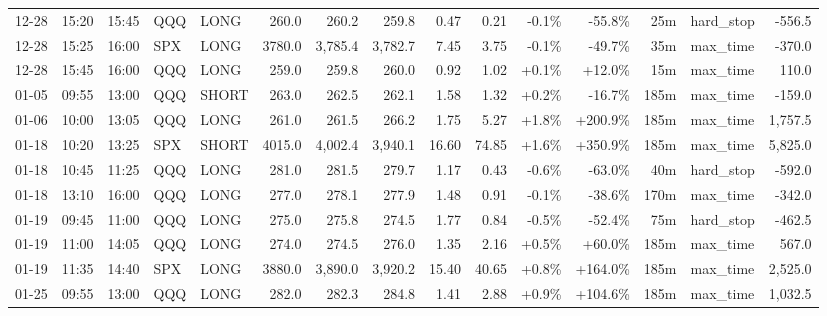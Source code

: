 \documentclass[11pt,a4paper,twoside]{article}
\begin{document}
\begin{landscape}
\begin{center}
\begin{longtable}{>{\color{txtmain}}l l l l l r r r r r r r r >{\color{txtmain}}l r}
12-28 & 15:20 & 15:45 & QQQ & LONG & 260.0 & 260.2 & 259.8 & 0.47 & 0.21 & \textcolor{lossred}{-0.1\%} & \textcolor{lossred}{-55.8\%} & 25m & hard\_stop & \textcolor{lossred}{-556.5} \\
12-28 & 15:25 & 16:00 & SPX & LONG & 3780.0 & 3,785.4 & 3,782.7 & 7.45 & 3.75 & \textcolor{lossred}{-0.1\%} & \textcolor{lossred}{-49.7\%} & 35m & max\_time & \textcolor{lossred}{-370.0} \\
12-28 & 15:45 & 16:00 & QQQ & LONG & 259.0 & 259.8 & 260.0 & 0.92 & 1.02 & \textcolor{wingreen}{+0.1\%} & \textcolor{wingreen}{+12.0\%} & 15m & max\_time & \textcolor{wingreen}{110.0} \\
01-05 & 09:55 & 13:00 & QQQ & SHORT & 263.0 & 262.5 & 262.1 & 1.58 & 1.32 & \textcolor{wingreen}{+0.2\%} & \textcolor{lossred}{-16.7\%} & 185m & max\_time & \textcolor{lossred}{-159.0} \\
01-06 & 10:00 & 13:05 & QQQ & LONG & 261.0 & 261.5 & 266.2 & 1.75 & 5.27 & \textcolor{wingreen}{+1.8\%} & \textcolor{wingreen}{+200.9\%} & 185m & max\_time & \textcolor{wingreen}{1,757.5} \\
01-18 & 10:20 & 13:25 & SPX & SHORT & 4015.0 & 4,002.4 & 3,940.1 & 16.60 & 74.85 & \textcolor{wingreen}{+1.6\%} & \textcolor{wingreen}{+350.9\%} & 185m & max\_time & \textcolor{wingreen}{5,825.0} \\
01-18 & 10:45 & 11:25 & QQQ & LONG & 281.0 & 281.5 & 279.7 & 1.17 & 0.43 & \textcolor{lossred}{-0.6\%} & \textcolor{lossred}{-63.0\%} & 40m & hard\_stop & \textcolor{lossred}{-592.0} \\
01-18 & 13:10 & 16:00 & QQQ & LONG & 277.0 & 278.1 & 277.9 & 1.48 & 0.91 & \textcolor{lossred}{-0.1\%} & \textcolor{lossred}{-38.6\%} & 170m & max\_time & \textcolor{lossred}{-342.0} \\
01-19 & 09:45 & 11:00 & QQQ & LONG & 275.0 & 275.8 & 274.5 & 1.77 & 0.84 & \textcolor{lossred}{-0.5\%} & \textcolor{lossred}{-52.4\%} & 75m & hard\_stop & \textcolor{lossred}{-462.5} \\
01-19 & 11:00 & 14:05 & QQQ & LONG & 274.0 & 274.5 & 276.0 & 1.35 & 2.16 & \textcolor{wingreen}{+0.5\%} & \textcolor{wingreen}{+60.0\%} & 185m & max\_time & \textcolor{wingreen}{567.0} \\
01-19 & 11:35 & 14:40 & SPX & LONG & 3880.0 & 3,890.0 & 3,920.2 & 15.40 & 40.65 & \textcolor{wingreen}{+0.8\%} & \textcolor{wingreen}{+164.0\%} & 185m & max\_time & \textcolor{wingreen}{2,525.0} \\
01-25 & 09:55 & 13:00 & QQQ & LONG & 282.0 & 282.3 & 284.8 & 1.41 & 2.88 & \textcolor{wingreen}{+0.9\%} & \textcolor{wingreen}{+104.6\%} & 185m & max\_time & \textcolor{wingreen}{1,032.5} \\

\end{longtable}
\end{center}
\end{landscape}
\end{document}

